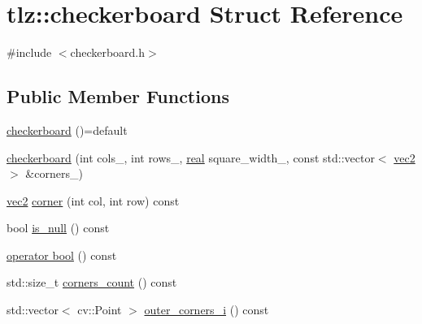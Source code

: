 \hypertarget{structtlz_1_1checkerboard}{}\section{tlz\+:\+:checkerboard Struct Reference}
\label{structtlz_1_1checkerboard}


{\ttfamily \#include $<$checkerboard.\+h$>$}

\subsection*{Public Member Functions}
\begin{DoxyCompactItemize}
\item 
\hyperlink{structtlz_1_1checkerboard_a44b150a25091e74cfaec42635d392369}{checkerboard} ()=default
\item 
\hyperlink{structtlz_1_1checkerboard_ac9ccb989809aaf6c014effd0c130e5ff}{checkerboard} (int cols\+\_\+, int rows\+\_\+, \hyperlink{namespacetlz_a15fd37cce97f2b8b606af18c2615f602}{real} square\+\_\+width\+\_\+, const std\+::vector$<$ \hyperlink{namespacetlz_ae192989bfbe6c700ac84d2a8cf05ebb4}{vec2} $>$ \&corners\+\_\+)
\item 
\hyperlink{namespacetlz_ae192989bfbe6c700ac84d2a8cf05ebb4}{vec2} \hyperlink{structtlz_1_1checkerboard_aa0961b41552bc73fc4f75d2dca128637}{corner} (int col, int row) const 
\item 
bool \hyperlink{structtlz_1_1checkerboard_af3b52bf7a7acd347ca098b534dbef0df}{is\+\_\+null} () const 
\item 
\hyperlink{structtlz_1_1checkerboard_a6ddadc2beababc24cbf12d8fb0124d02}{operator bool} () const 
\item 
std\+::size\+\_\+t \hyperlink{structtlz_1_1checkerboard_aefd2234a4be7f364920076cdd8a977f1}{corners\+\_\+count} () const 
\item 
std\+::vector$<$ cv\+::\+Point $>$ \hyperlink{structtlz_1_1checkerboard_a2684fe6c45bc112b0a5c3d6e833ba22e}{outer\+\_\+corners\+\_\+i} () const 
\end{DoxyCompactItemize}
